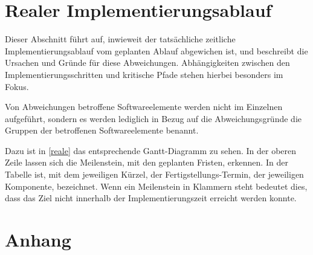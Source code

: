 \documentclass[parskip=full]{scrartcl}
\begin{document}
\section{Realer Implementierungsablauf}

Dieser Abschnitt führt auf, inwieweit der tatsächliche zeitliche Implementierungsablauf vom geplanten Ablauf abgewichen ist, und beschreibt die Ursachen und Gründe für diese Abweichungen. Abhängigkeiten zwischen den Implementierungsschritten und kritische Pfade stehen hierbei besonders im Fokus.

Von Abweichungen betroffene Softwareelemente werden nicht im Einzelnen aufgeführt, sondern es werden lediglich in Bezug auf die Abweichungsgründe die Gruppen der betroffenen Softwareelemente benannt.

Dazu ist in \ref{reale} das entsprechende Gantt-Diagramm zu sehen. In der oberen Zeile lassen sich die Meilenstein, mit den geplanten Fristen, erkennen. In der Tabelle ist, mit dem jeweiligen Kürzel, der Fertigstellungs-Termin, der jeweiligen Komponente, bezeichnet. Wenn ein Meilenstein in Klammern steht bedeutet dies, dass das Ziel nicht innerhalb der Implementierungszeit erreicht werden konnte.

\section{Anhang}
\end{document}
